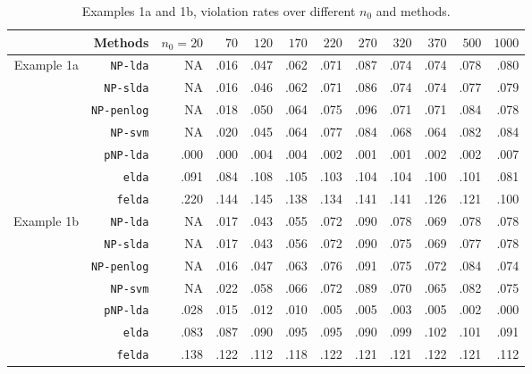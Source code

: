 \documentclass[12pt]{article}
\numberwithin{equation}{section}
\theoremstyle{remark}
\newcommand{\1}{{\rm 1}\kern-0.24em{\rm I}}
\begin{document}
\begin{appendices}
\begin{table}[t]
\caption{Examples 1a and 1b,  violation rates over different $n_0$ and methods.\label{tb::simu1ab}}
\centering
\renewcommand{\arraystretch}{0.6}
\begin{tabular}{r|rrrrrrrrrrr}
\hline
&Methods&$n_0=20$&$70$&$120$&$170$&$220$&$270$&$320$&$370$&$500$&$1000$\\
\hline
\multirow{7}{2cm}{Example 1a}
&\texttt{NP-lda}&NA&.016&.047&.062&.071&.087&.074&.074&.078&.080\\
 &\texttt{NP-slda}&NA&.016&.046&.062&.071&.086&.074&.074&.077&.079\\
&\texttt{NP-penlog}&NA&.018&.050&.064&.075&.096&.071&.071&.084&.078\\
&\texttt{NP-svm}&NA&.020&.045&.064&.077&.084&.068&.064&.082&.084\\
 &\texttt{pNP-lda}&.000&.000&.004&.004&.002&.001&.001&.002&.002&.007\\
 &\texttt{elda}&.091&.084&.108&.105&.103&.104&.104&.100&.101&.081\\
&\texttt{felda}&.220&.144&.145&.138&.134&.141&.141&.126&.121&.100\\
\hline
\multirow{7}{2cm}{Example 1b}
&\texttt{NP-lda}&NA&.017&.043&.055&.072&.090&.078&.069&.078&.078\\
 &\texttt{NP-slda}&NA&.017&.043&.056&.072&.090&.075&.069&.077&.078\\
&\texttt{NP-penlog}&NA&.016&.047&.063&.076&.091&.075&.072&.084&.074\\
&\texttt{NP-svm}&NA&.022&.058&.066&.072&.089&.070&.065&.082&.075\\
 &\texttt{pNP-lda}&.028&.015&.012&.010&.005&.005&.003&.005&.002&.000\\
 &\texttt{elda}&.083&.087&.090&.095&.095&.090&.099&.102&.101&.091\\
&\texttt{felda}&.138&.122&.112&.118&.122&.121&.121&.122&.121&.112\\
\hline
\end{tabular}
\end{table}


\end{appendices}
\end{document}
